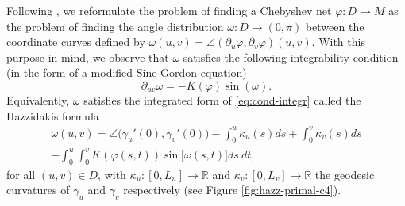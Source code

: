 \documentclass{article}
\newcommand{\DUV}{\partial_{uv}}
\newcommand{\R}{\mathbb{R}}
\newcommand{\surf}{M}
\newcommand{\ko}{\kappa}
\newcommand{\DU}{\partial_{u}}
\newcommand{\DV}{\partial_{v}}
\theoremstyle{remark}
\theoremstyle{prpart}
\begin{document}
Following \cite{Ghys09}, we reformulate the problem of finding a Chebyshev net $\varphi:D\to\surf$ as the problem of finding the angle distribution $\omega:D\to(0,\pi)$ between the coordinate curves defined by $\omega(u,v) = \angle(\DU\varphi, \DV\varphi)(u,v)$. With this purpose in mind, we observe that $\omega$ satisfies the following integrability condition (in the form of a modified Sine-Gordon equation) \cite{Ghys09}
\begin{equation}  \label{eq:cond-integr}
  \DUV \omega = -K(\varphi) \sin(\omega).
\end{equation}
Equivalently, $\omega$ satisfies the integrated form of \eqref{eq:cond-integr} called the Hazzidakis formula
\begin{multline}  \label{eq:hazz-form}
 \omega(u,v) = \angle\big(\gamma_u'(0),\gamma_v'(0)\big) - \int_0^u \ko_u(s)ds +
  \int_{0}^v\ko_v(s)ds\\
 - \int_0^u\int_0^vK(\varphi(s,t))\sin\big[\omega(s,t)\big]ds~dt,
\end{multline} 
for all $(u,v)\in D$, with $\ko_u:[0,L_u]\to\R$ and $\ko_v:[0,L_v]\to\R$ the geodesic curvatures of $\gamma_u$ and $\gamma_v$ respectively (see Figure \ref{fig:hazz-primal-c4}). 
\end{document}
